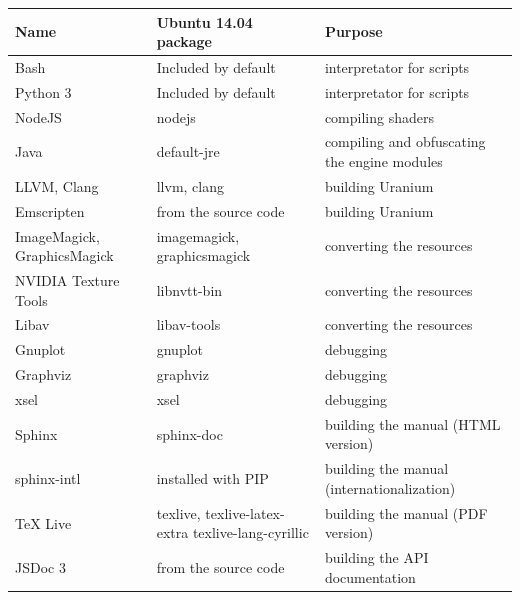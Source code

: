 \documentclass[a4paper,12pt,oneside]{sphinxmanual}
\begin{document}
\begin{tabulary}{\linewidth}{|L|L|L|}
\hline
\textsf{\relax 
Name
} & \textsf{\relax 
Ubuntu 14.04 package
} & \textsf{\relax 
Purpose
}\\
\hline
Bash
 & 
Included by default
 & 
interpretator for scripts
\\

Python 3
 & 
Included by default
 & 
interpretator for scripts
\\

NodeJS
 & 
nodejs
 & 
compiling shaders
\\

Java
 & 
default-jre
 & 
compiling and obfuscating the engine modules
\\

LLVM, Clang
 & 
llvm, clang
 & 
building Uranium
\\

Emscripten
 & 
from the source code
 & 
building Uranium
\\

ImageMagick, GraphicsMagick
 & 
imagemagick, graphicsmagick
 & 
converting the resources
\\

NVIDIA Texture Tools
 & 
libnvtt-bin
 & 
converting the resources
\\

Libav
 & 
libav-tools
 & 
converting the resources
\\

Gnuplot
 & 
gnuplot
 & 
debugging
\\

Graphviz
 & 
graphviz
 & 
debugging
\\

xsel
 & 
xsel
 & 
debugging
\\

Sphinx
 & 
sphinx-doc
 & 
building the manual (HTML version)
\\

sphinx-intl
 & 
installed with PIP
 & 
building the manual (internationalization)
\\

TeX Live
 & 
texlive, texlive-latex-extra
texlive-lang-cyrillic
 & 
building the manual (PDF version)
\\

JSDoc 3
 & 
from the source code
 & 
building the API documentation
\\
\hline\end{tabulary}
\end{document}
